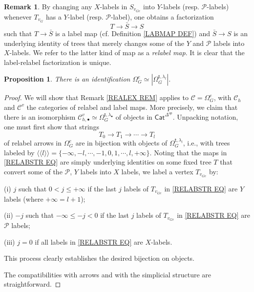 \documentclass[a4paper,10pt
,draft
]{article}%
\numberwithin{equation}{section}
\numberwithin{figure}{section}
\newtheorem{proposition}[equation]{Proposition}%
\theoremstyle{definition} %
\newtheorem{remark}[equation]{Remark}%
\newcommand{\1}{\ensuremath{\mathbbm 1}}%
\begin{document}
\begin{remark}
By changing any $X$-labels in $S_{v_{G e}}$ 
into $Y$-labels (resp. $\mathcal{P}$-labels)
whenever $T_{v_{G}}$  has a 
$Y$-label (resp. $\mathcal{P}$-label), one obtains a factorization
\[ T \to \bar{S} \to S \]
such that $T \to \bar{S}$ is a label map 
(cf. Definition \ref{LABMAP DEF})
and $\bar{S} \to S$ is an underlying identity of trees that
merely changes some of the $Y$ and $\mathcal{P}$ labels into 
$X$-labels.
We refer to the latter kind of map as a \textit{relabel map}.
It is clear that the label-relabel factorization 
 is unique.
\end{remark}

\begin{proposition}\label{BISIMP PROP}
There is an identification
$\Omega_G^e \simeq 
|\Omega_{G}^{\mathsf{t},\lambda_l}|$.
\end{proposition}


\begin{proof}
We will show that Remark \ref{REALEX REM} applies to 
$\mathcal{C} = \Omega_G^e$,
with $\mathcal{C}_h$ and $\mathcal{C}^v$ the categories of 
relabel and label maps.
More precisely, we claim that there is an isomorphism 
$\mathcal{C}_{h,\bullet}^{v} \simeq 
\Omega_{G}^{\mathsf{t},\lambda_{\bullet}}$
of objects in $\mathsf{Cat}^{\Delta^{op}}$.
Unpacking notation, one must first show that strings
\begin{equation}\label{RELABSTR EQ}
T_0 \to T_1 \to \cdots \to T_l
\end{equation}
 of relabel arrows in $\Omega_G^e$
 are in bijection with objects of 
 $\Omega_{G}^{\mathsf{t},\lambda_l}$,
 i.e., with trees labeled by
 $\langle \langle l \rangle \rangle =
  \{-\infty, -l, \cdots, -1,0,1,\cdots,l,+ \infty\}$.
Noting that the maps in
\eqref{RELABSTR EQ}
are simply underlying identities on some fixed tree $T$
that convert some of the $\mathcal{P}$, $Y$ labels into $X$ labels,
we label a vertex $T_{v_{Ge}}$ by:
\begin{inparaenum}
\item[(i)]
$j$ such that
$0 < j \leq +\infty$
if the last $j$ labels of $T_{v_{Ge}}$ in 
\eqref{RELABSTR EQ} are $Y$ labels (where $+\infty = l+1$); 
\item[(ii)]
$-j$ such that
$-\infty \leq -j < 0$
if the last $j$ labels of $T_{v_{Ge}}$ in 
\eqref{RELABSTR EQ} are $\mathcal{P}$ labels;
\item[(iii)] $j=0$ if all labels in \eqref{RELABSTR EQ}
are $X$-labels.
\end{inparaenum}
 This process clearly establishes the desired bijection on objects.

The compatibilities with arrows and with the simplicial structure are straightforward.
\end{proof}
\end{document}
